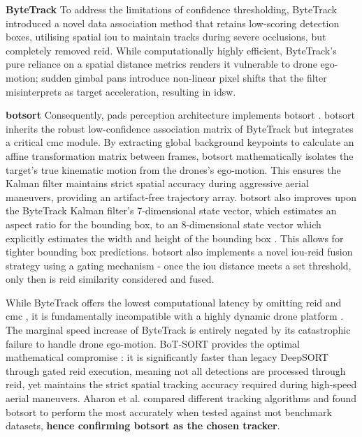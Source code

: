 \documentclass{report_template_oxford}
\begin{document}
\textbf{ByteTrack} To address the limitations of confidence thresholding, ByteTrack \cite{zhang2022bytetrack} introduced a novel data association method that retains low-scoring detection boxes, utilising spatial \gls{iou} to maintain tracks during severe occlusions, but completely removed \gls{reid}. While computationally highly efficient, ByteTrack's pure reliance on a spatial distance metrics renders it vulnerable to drone ego-motion; sudden gimbal pans introduce non-linear pixel shifts that the filter misinterprets as target acceleration, resulting in \gls{idsw}.

\textbf{\gls{botsort}} Consequently, \gls{pads} perception architecture implements \gls{botsort} \cite{botsort}. \gls{botsort} inherits the robust low-confidence association matrix of ByteTrack but integrates a critical \gls{cmc} module. By extracting global background keypoints to calculate an affine transformation matrix between frames, \gls{botsort} mathematically isolates the target's true kinematic motion from the drones's ego-motion. This ensures the Kalman filter maintains strict spatial accuracy during aggressive aerial maneuvers, providing an artifact-free trajectory array. \gls{botsort} also improves upon the ByteTrack Kalman filter's 7-dimensional state vector, which estimates an aspect ratio for the bounding box, to an 8-dimensional state vector which explicitly estimates the width and height of the bounding box \cite{botsort}. This allows for tighter bounding box predictions. \gls{botsort} also implements a novel \gls{iou}-\gls{reid} fusion strategy using a gating mechanism - once the \gls{iou} distance meets a set threshold, only then is \gls{reid} similarity considered and fused. 

While ByteTrack offers the lowest computational latency by omitting \gls{reid} and \gls{cmc} \cite{bot_vs_byte_2024}, it is fundamentally incompatible with a highly dynamic drone platform \cite{bytrack_uav_incompatibility}. The marginal speed increase of ByteTrack is entirely negated by its catastrophic failure to handle drone ego-motion. BoT-SORT provides the optimal mathematical compromise \cite{bot_vs_byte_2024}: it is significantly faster than legacy DeepSORT through gated \gls{reid} execution, meaning not all detections are processed through \gls{reid}, yet maintains the strict spatial tracking accuracy required during high-speed aerial maneuvers. Aharon et al. \cite{botsort} compared different tracking algorithms and found \gls{botsort} to perform the most accurately when tested against \gls{mot} benchmark datasets, \textbf{hence confirming \gls{botsort} as the chosen tracker}.  
\end{document}
